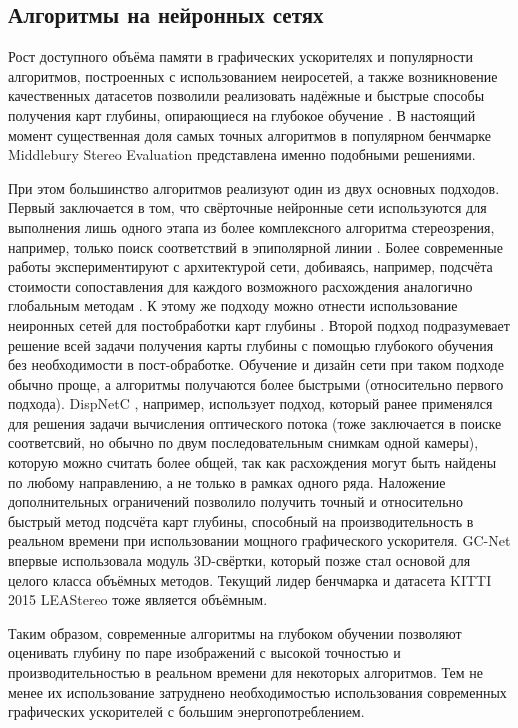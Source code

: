 \subsection{Алгоритмы на нейронных сетях}

Рост доступного объёма памяти в графических ускорителях и популярности алгоритмов, построенных с использованием неиросетей, а также возникновение качественных датасетов позволили реализовать надёжные и быстрые способы 
получения карт глубины, опирающиеся на глубокое обучение \cite{neural_review}. В настоящий момент существенная доля самых точных алгоритмов в популярном бенчмарке Middlebury Stereo Evaluation \cite{stereo_bench} представлена именно
подобными решениями. 

При этом большинство алгоритмов реализуют один из двух основных подходов. Первый заключается в том, что свёрточные нейронные сети используются для выполнения лишь одного этапа из более комплексного алгоритма стереозрения, 
например, только поиск соответствий в эпиполярной линии \cite{cnn_match}. Более современные работы экспериментируют с архитектурой сети, добиваясь, например, подсчёта стоимости сопоставления для каждого возможного расхождения аналогично
глобальным методам \cite{cnn_improv}.  К этому же подходу можно отнести использование неиронных сетей для постобработки карт глубины \cite{cnn_post1}.  
Второй подход подразумевает решение всей задачи получения карты глубины с помощью глубокого обучения без необходимости в пост-обработке. Обучение и дизайн сети при таком подходе обычно проще, а алгоритмы получаются более быстрыми (относительно первого подхода).
 DispNetC \cite{cnn_ete1}, например, использует подход, который ранее применялся для решения задачи вычисления оптического потока (тоже заключается в поиске соответсвий, но обычно по двум последовательным снимкам одной камеры), 
 которую можно считать более общей, так как расхождения могут быть найдены по любому направлению, а не только в рамках одного ряда. Наложение дополнительных ограничений позволило получить точный и относительно быстрый метод подсчёта карт глубины, 
способный на производительность в реальном времени при использовании мощного графического ускорителя. GC-Net \cite{gc_net} впервые использовала модуль 3D-свёртки, который позже стал основой для целого класса объёмных методов. Текущий 
лидер бенчмарка и датасета KITTI 2015 \cite{kitti} LEAStereo \cite{top_net} тоже является объёмным.

Таким образом, современные алгоритмы на глубоком обучении позволяют оценивать глубину по паре изображений с высокой точностью и производительностью в реальном времени для некоторых алгоритмов. Тем не менее их использование затруднено 
необходимостью использования современных графических ускорителей с большим энергопотреблением. 


